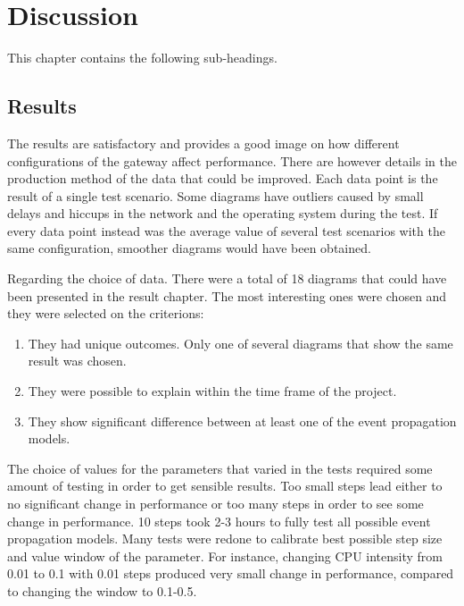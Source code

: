 \chapter{Discussion}
\label{cha:discussion}

This chapter contains the following sub-headings.

\section{Results}
\label{sec:discussion-results}

The results are satisfactory and provides a good image on how different
configurations of the gateway affect performance. There are however details in
the production method of the data that could be improved. Each data point is
the result of a single test scenario. Some diagrams have outliers caused by
small delays and hiccups in the network and the operating system during the
test. If every data point instead was the average value of several test
scenarios with the same configuration, smoother diagrams would have been
obtained.

Regarding the choice of data. There were a total of 18 diagrams that could have
been presented in the result chapter. The most interesting ones were chosen and
they were selected on the criterions:

\begin{enumerate}
    \item They had unique outcomes. Only one of several diagrams that show the
        same result was chosen.
    \item They were possible to explain within the time frame of the project.
    \item They show significant difference between at least one of the event
        propagation models.
\end{enumerate}

The choice of values for the parameters that varied in the tests required some
amount of testing in order to get sensible results. Too small steps lead either
to no significant change in performance or too many steps in order to see some
change in performance. 10 steps took 2-3 hours to fully test all possible
event propagation models. Many tests were redone to calibrate best possible
step size and value window of the parameter. For instance, changing CPU
intensity from 0.01 to 0.1 with 0.01 steps produced very small change in
performance, compared to changing the window to 0.1-0.5.

